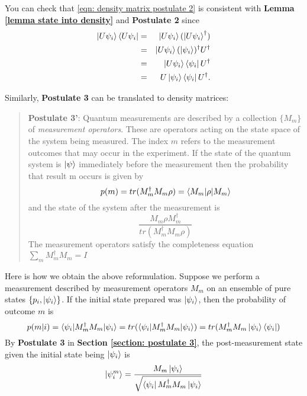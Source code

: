 You can check that \eqref{eqn: density matrix postulate 2} is consistent with \textbf{Lemma \ref{lemma state into density}} and {\bf{Postulate 2}} since
\begin{eqnarray}
\ket{U \psi_i}\bra{U \psi_i}&=& \ket{U \psi_i}(\ket{U \psi_i}^\dagger)\\
&=& \ket{U\psi_i}(\ket{\psi_i})^\dagger U^\dagger\\
&=& \ket{U \psi_i} \bra{\psi_i}U^\dagger\\
&=& U \ket{\psi_i}\bra{\psi_i}U^\dagger.
\end{eqnarray}

Similarly, \textbf{Postulate 3} can be translated to density matrices:
\begin{quote}
    \textbf{Postulate 3'}: Quantum measurements are described by a collection $\{M_m\}$ of \textit{measurement operators}. These are operators acting on the state space of the system being measured. The index $m$ refers to the measurement outcomes that may occur in the experiment. If the state of the quantum system is $\ket{\psi}$ immediately before the measurement then the probability that result m occurs is given by 
    \begin{equation} \label{eqn: general measurement probability density matrix}
        p(m)=tr(M_m^\dagger M_m \rho)=\braket{M_m| \rho |M_m}
    \end{equation}
    and the state of the system after the measurement is
    \begin{equation}
        \frac{M_m \rho M_m^\dagger}{tr(M_m^\dagger M_m \rho)}
    \end{equation}
    The measurement operators satisfy the completeness equation $\sum_m M_m^\dagger M_m =I$
\end{quote}
Here is how we obtain the above reformulation. Suppose we perform a measurement described by measurement operators $M_m$ on an ensemble of pure states $\{p_i, \ket{\psi_i}\}$. If the initial state prepared was $\ket{\psi_i}$, then the probability of outcome $m$ is
    \begin{equation}
        p(m|i)=\braket{\psi_i|M_m^\dagger M_m|\psi_i}=tr(\braket{\psi_i|M_m^\dagger M_m|\psi_i})=tr(M_m^\dagger M_m \ket{\psi_i}\bra{\psi_i})
    \end{equation}
    By \textbf{Postulate 3} in \textbf{Section \ref{section: postulate 3}}, the post-measurement state given the initial state being $\ket{\psi_i}$ is
    \begin{equation}
        \ket{\psi_i^m}=\frac{M_m \ket{\psi_i}}{\sqrt{\bra{\psi_i}M_m^\dagger M_m \ket{\psi_i}}}
    \end{equation}

